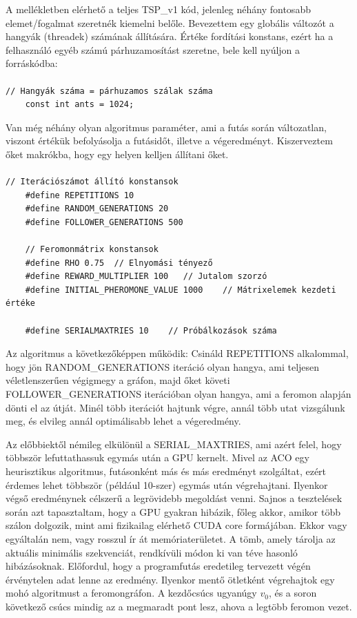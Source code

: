 A mellékletben elérhető a teljes TSP\_v1 kód, jelenleg néhány fontosabb elemet/fogalmat szeretnék kiemelni belőle.
Bevezettem egy globális változót a hangyák (threadek) számának állítására. Értéke fordítási konstans, ezért ha a felhasználó egyéb számú párhuzamosítást szeretne, bele kell nyúljon a forráskódba:
\paragraph{}
\noindent
\begin{lstlisting}[style=CStyle]
	// Hangyák száma = párhuzamos szálak száma
	const int ants = 1024;
\end{lstlisting}

Van még néhány olyan algoritmus paraméter, ami a futás során változatlan, viszont értékük befolyásolja a futásidőt, illetve a végeredményt. Kiszerveztem őket makrókba, hogy egy helyen kelljen állítani őket.
\paragraph{}
\noindent
\begin{lstlisting}[style=CStyle]
	// Iterációszámot állító konstansok
	#define REPETITIONS 10
	#define RANDOM_GENERATIONS 20
	#define FOLLOWER_GENERATIONS 500
	
	// Feromonmátrix konstansok
	#define RHO 0.75  // Elnyomási tényező
	#define REWARD_MULTIPLIER 100   // Jutalom szorzó
	#define INITIAL_PHEROMONE_VALUE 1000    // Mátrixelemek kezdeti értéke
	
	#define SERIALMAXTRIES 10    // Próbálkozások száma
\end{lstlisting}

Az algoritmus a következőképpen működik: Csináld REPETITIONS alkalommal, hogy jön RANDOM\_GENERATIONS iteráció olyan hangya, ami teljesen véletlenszerűen végigmegy a gráfon, majd őket követi FOLLOWER\_GENERATIONS iterációban olyan hangya, ami a feromon alapján dönti el az útját. Minél több iterációt hajtunk végre, annál több utat vizsgálunk meg, és elvileg annál optimálisabb lehet a végeredmény.

Az előbbiektől némileg elkülönül a SERIAL\_MAXTRIES, ami azért felel, hogy többször lefuttathassuk egymás után a GPU kernelt. Mivel az ACO egy heurisztikus algoritmus, futásonként más és más eredményt szolgáltat, ezért érdemes lehet többször (például 10-szer) egymás után végrehajtani. Ilyenkor végső eredménynek célszerű a legrövidebb megoldást venni. Sajnos a tesztelések során azt tapasztaltam, hogy a GPU gyakran hibázik, főleg akkor, amikor több szálon dolgozik, mint ami fizikailag elérhető CUDA core formájában. Ekkor vagy egyáltalán nem, vagy rosszul ír át memóriaterületet. A tömb, amely tárolja az aktuális minimális szekvenciát, rendkívüli módon ki van téve hasonló hibázásoknak. Előfordul, hogy a programfutás eredetileg tervezett végén érvénytelen adat lenne az eredmény. Ilyenkor mentő ötletként végrehajtok egy mohó algoritmust a feromongráfon. A kezdőcsúcs ugyanúgy \(v_{0}\), és a soron következő csúcs mindig az a megmaradt pont lesz, ahova a legtöbb feromon vezet.

